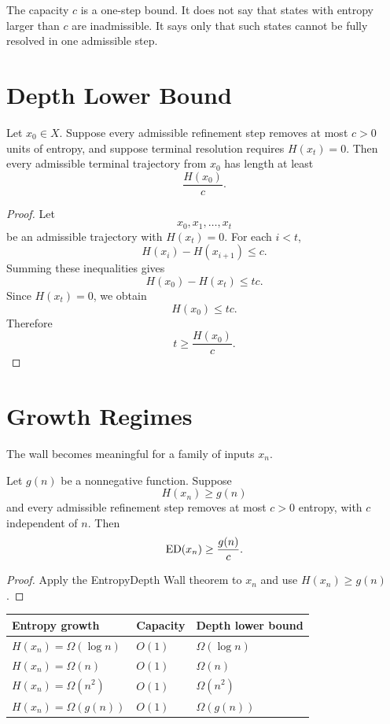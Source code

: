 The capacity \(c\) is a one-step bound. It does not say that states with
entropy larger than \(c\) are inadmissible. It says only that such states
cannot be fully resolved in one admissible step.

\section{Depth Lower Bound}

\begin{theorem}
Let \(x_0\in X\). Suppose every admissible refinement step removes at most
\(c>0\) units of entropy, and suppose terminal resolution requires
\(H(x_t)=0\). Then every admissible terminal trajectory from \(x_0\) has length
at least
\[
\frac{H(x_0)}{c}.
\]
\end{theorem}

\begin{proof}
Let
\[
x_0,x_1,\ldots,x_t
\]
be an admissible trajectory with \(H(x_t)=0\). For each \(i<t\),
\[
H(x_i)-H(x_{i+1})\le c.
\]
Summing these inequalities gives
\[
H(x_0)-H(x_t)\le tc.
\]
Since \(H(x_t)=0\), we obtain
\[
H(x_0)\le tc.
\]
Therefore
\[
t\ge \frac{H(x_0)}{c}.
\]
\end{proof}

\section{Growth Regimes}

The wall becomes meaningful for a family of inputs \(x_n\).

\begin{theorem}
Let \(g(n)\) be a nonnegative function. Suppose
\[
H(x_n)\ge g(n)
\]
and every admissible refinement step removes at most \(c>0\) entropy, with
\(c\) independent of \(n\). Then
\[
\mathrm{ED}(x_n)\ge \frac{g(n)}{c}.
\]
\end{theorem}

\begin{proof}
Apply the EntropyDepth Wall theorem to \(x_n\) and use
\(H(x_n)\ge g(n)\).
\end{proof}

\begin{center}
\begin{tabular}{lll}
\toprule
Entropy growth & Capacity & Depth lower bound \\
\midrule
\(H(x_n)=\Omega(\log n)\) & \(O(1)\) & \(\Omega(\log n)\) \\
\(H(x_n)=\Omega(n)\) & \(O(1)\) & \(\Omega(n)\) \\
\(H(x_n)=\Omega(n^2)\) & \(O(1)\) & \(\Omega(n^2)\) \\
\(H(x_n)=\Omega(g(n))\) & \(O(1)\) & \(\Omega(g(n))\) \\
\bottomrule
\end{tabular}
\end{center}

